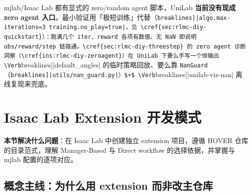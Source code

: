 
\begin{note}
mjlab/Isaac Lab 都有显式的 zero/random agent 脚本，UniLab \textbf{当前没有现成 zero agent 入口}。最小验证用「极短训练」代替（\Verb[breaklines]|algo.max-iterations=3 training.no_play=true|，见 \cref{sec:rlmc-diy-quickstart}）：跑满几个 iter、reward 各项有数值、无 NaN 即说明 obs/reward/step 链路通。\cref{sec:rlmc-diy-threestep} 的 zero agent 诊断洞察（\cref{ins:rlmc-diy-zeroagent}）在 UniLab 下要么手写一个恒输出 \Verb[breaklines]|default_angles| 的临时策略回放、要么靠 \verb|NanGuard|（\Verb[breaklines]|utils/nan_guard.py|）$+$ \Verb[breaklines]|unilab-viz-nan| 离线复现来兜底。
\end{note}

\section{Isaac Lab Extension 开发模式}
\label{sec:rlmc-diy-isaac}

\textbf{本节解决什么问题}：在 Isaac Lab 中创建独立 extension 项目，遵循 HOVER 仓库的目录范式，理解 Manager-Based 与 Direct workflow 的选择依据，并掌握与 mjlab 配置的逐项对应。

\subsection{概念主线：为什么用 extension 而非改主仓库}
\label{sec:rlmc-diy-isaac-why}

